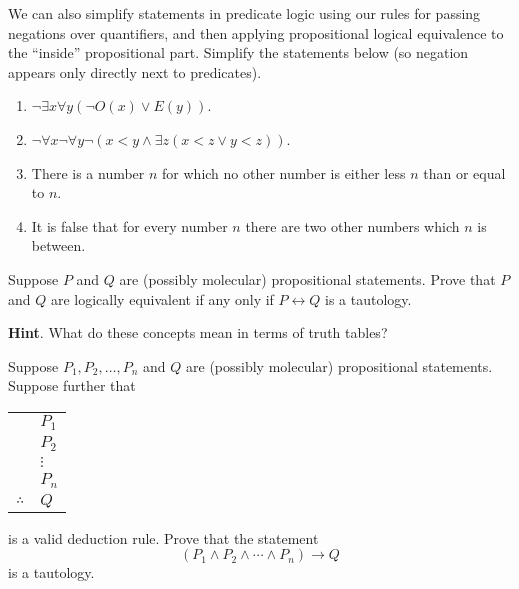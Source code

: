 \documentclass[11pt,]{book}
\theoremstyle{ptxplainnotitle}
\theoremstyle{ptxplaintitle}
\theoremstyle{ptxdefinitionnotitle}
\theoremstyle{ptxdefinitiontitle}
\theoremstyle{ptxdefinitionnotitle}
\theoremstyle{ptxdefinitiontitle}
\theoremstyle{ptxdefinitionnotitle}
\theoremstyle{ptxdefinitiontitle}
\theoremstyle{ptxdefinitiontitlenonumber}
\theoremstyle{ptxdefinitiontitlenonumber}
\numberwithin{equation}{chapter}
\newcommand{\hrulethin}  {\noalign{\hrule height 0.04em}}
\renewcommand{\iff}{\leftrightarrow}
\newcommand{\imp}{\rightarrow}
\newcommand{\lt}{<}
\begin{document}
\begin{divisionexercise}{15}\hypertarget{exercise-185}{}
\hypertarget{p-2351}{}%
We can also simplify statements in predicate logic using our rules for passing negations over quantifiers, and then applying propositional logical equivalence to the ``inside'' propositional part.  Simplify the statements below (so negation appears only directly next to predicates). \leavevmode%
\begin{enumerate}[label=(\alph*)]
\item\hypertarget{li-1209}{}\(\neg \exists x \forall y (\neg O(x) \vee E(y))\).%
\item\hypertarget{li-1210}{}\(\neg \forall x \neg \forall y \neg(x \lt  y \wedge \exists z (x \lt  z \vee y \lt  z))\).%
\item\hypertarget{li-1211}{}\hypertarget{p-2352}{}%
There is a number \(n\) for which no other number is either less \(n\) than or equal to \(n\).%
\item\hypertarget{li-1212}{}\hypertarget{p-2353}{}%
It is false that for every number \(n\) there are two other numbers which \(n\) is between.%
\end{enumerate}
%
\end{divisionexercise}%
\begin{divisionexercise}{16}\hypertarget{exercise-186}{}
\hypertarget{p-2357}{}%
Suppose \(P\) and \(Q\) are (possibly molecular) propositional statements.  Prove that \(P\) and \(Q\) are logically equivalent if any only if \(P \iff Q\) is a tautology.%
\par\smallskip%
\noindent\textbf{Hint}.\hypertarget{hint-15}{}\quad%
\hypertarget{p-2358}{}%
What do these concepts mean in terms of truth tables?%
\end{divisionexercise}%
\begin{divisionexercise}{17}\hypertarget{exercise-187}{}
\hypertarget{p-2359}{}%
Suppose \(P_1, P_2, \ldots, P_n\) and \(Q\) are (possibly molecular) propositional statements.  Suppose further that%
\begin{sidebyside}{1}{0}{0}{0}
\begin{sbspanel}{1}
{\centering%
\begin{tabular}{ll}
&\(P_1\)\tabularnewline[0pt]
&\(P_2\)\tabularnewline[0pt]
&\(\vdots\)\tabularnewline[0pt]
&\(P_n\)\tabularnewline\hrulethin
\(\therefore\)&\(Q\)
\end{tabular}
\par}
\end{sbspanel}
\end{sidebyside}
\par
\hypertarget{p-2360}{}%
is a valid deduction rule.  Prove that the statement%
\begin{equation*}
(P_1 \wedge P_2 \wedge \cdots \wedge P_n) \imp Q
\end{equation*}
is a tautology.%
\end{divisionexercise}%
\typeout{************************************************}
\typeout{************************************************}
\end{document}
